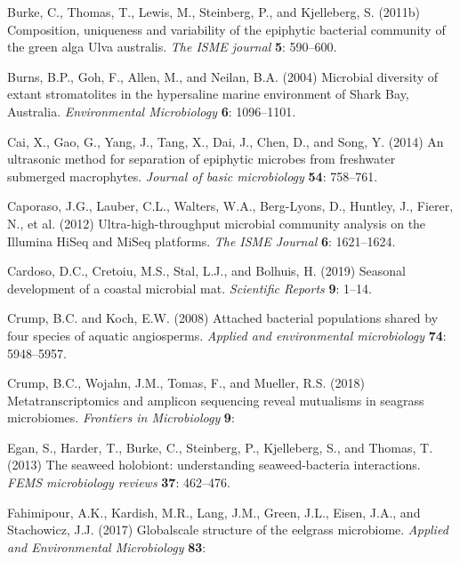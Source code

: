 \documentclass[12pt,]{article}
\begin{document}
\leavevmode\hypertarget{ref-Burke2011b}{}%
Burke, C., Thomas, T., Lewis, M., Steinberg, P., and Kjelleberg, S.
(2011b) Composition, uniqueness and variability of the epiphytic
bacterial community of the green alga Ulva australis. \emph{The ISME
journal} \textbf{5}: 590--600.

\leavevmode\hypertarget{ref-Burns2004}{}%
Burns, B.P., Goh, F., Allen, M., and Neilan, B.A. (2004) Microbial
diversity of extant stromatolites in the hypersaline marine environment
of Shark Bay, Australia. \emph{Environmental Microbiology} \textbf{6}:
1096--1101.

\leavevmode\hypertarget{ref-Cai2014}{}%
Cai, X., Gao, G., Yang, J., Tang, X., Dai, J., Chen, D., and Song, Y.
(2014) An ultrasonic method for separation of epiphytic microbes from
freshwater submerged macrophytes. \emph{Journal of basic microbiology}
\textbf{54}: 758--761.

\leavevmode\hypertarget{ref-Caporaso2012}{}%
Caporaso, J.G., Lauber, C.L., Walters, W.A., Berg-Lyons, D., Huntley,
J., Fierer, N., et al. (2012) Ultra-high-throughput microbial community
analysis on the Illumina HiSeq and MiSeq platforms. \emph{The ISME
Journal} \textbf{6}: 1621--1624.

\leavevmode\hypertarget{ref-Cardoso2019}{}%
Cardoso, D.C., Cretoiu, M.S., Stal, L.J., and Bolhuis, H. (2019)
Seasonal development of a coastal microbial mat. \emph{Scientific
Reports} \textbf{9}: 1--14.

\leavevmode\hypertarget{ref-Crump2008}{}%
Crump, B.C. and Koch, E.W. (2008) Attached bacterial populations shared
by four species of aquatic angiosperms. \emph{Applied and environmental
microbiology} \textbf{74}: 5948--5957.

\leavevmode\hypertarget{ref-Crump2018}{}%
Crump, B.C., Wojahn, J.M., Tomas, F., and Mueller, R.S. (2018)
Metatranscriptomics and amplicon sequencing reveal mutualisms in
seagrass microbiomes. \emph{Frontiers in Microbiology} \textbf{9}:

\leavevmode\hypertarget{ref-Egan2013}{}%
Egan, S., Harder, T., Burke, C., Steinberg, P., Kjelleberg, S., and
Thomas, T. (2013) The seaweed holobiont: understanding seaweed-bacteria
interactions. \emph{FEMS microbiology reviews} \textbf{37}: 462--476.

\leavevmode\hypertarget{ref-Fahimipour2017}{}%
Fahimipour, A.K., Kardish, M.R., Lang, J.M., Green, J.L., Eisen, J.A.,
and Stachowicz, J.J. (2017) Globalscale structure of the eelgrass
microbiome. \emph{Applied and Environmental Microbiology} \textbf{83}:
\end{document}
